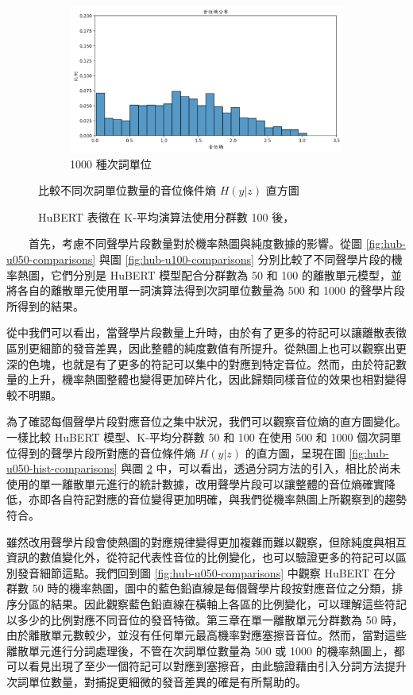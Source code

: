 {{{{\begin{figure}
\begin{subfigure}{\textwidth}
                 \centering
                 \includegraphics[width=\tempwidth]{feasiblefigs/ch4figs/hub-u100-ap1000-phnent-hist.png}
                 \caption{1000 種次詞單位}
                 \label{fig:hub-u100-ap1000-phnent-hist}
             \end{subfigure}

             \caption{HuBERT 表徵在 K-平均演算法使用分群數 100 後，}
             比較不同次詞單位數量的音位條件熵 $H(y|z)$ 直方圖
             \label{fig:hub-u100-hist-comparisons}
        \end{figure}
    }
}


　　首先，考慮不同聲學片段數量對於機率熱圖與純度數據的影響。從圖 \ref{fig:hub-u050-comparisons} 與圖 \ref{fig:hub-u100-comparisons} 分別比較了不同聲學片段的機率熱圖，它們分別是 HuBERT 模型配合分群數為 50 和 100 的離散單元模型，並將各自的離散單元使用單一詞演算法得到次詞單位數量為 500 和 1000 的聲學片段所得到的結果。\par
        從中我們可以看出，當聲學片段數量上升時，由於有了更多的符記可以讓離散表徵區別更細節的發音差異，因此整體的純度數值有所提升。從熱圖上也可以觀察出更深的色塊，也就是有了更多的符記可以集中的對應到特定音位。然而，由於符記數量的上升，機率熱圖整體也變得更加碎片化，因此歸類同樣音位的效果也相對變得較不明顯。\par
        為了確認每個聲學片段對應音位之集中狀況，我們可以觀察音位熵的直方圖變化。一樣比較 HuBERT 模型、K-平均分群數 50 和 100 在使用 500 和 1000 個次詞單位得到的聲學片段所對應的音位條件熵 $H(y|z)$ 的直方圖，呈現在圖 \ref{fig:hub-u050-hist-comparisons} 與圖 \ref{fig:hub-u100-hist-comparisons} 中，可以看出，透過分詞方法的引入，相比於尚未使用的單一離散單元進行的統計數據，改用聲學片段可以讓整體的音位熵確實降低，亦即各自符記對應的音位變得更加明確，與我們從機率熱圖上所觀察到的趨勢符合。\par
        雖然改用聲學片段會使熱圖的對應規律變得更加複雜而難以觀察，但除純度與相互資訊的數值變化外，從符記代表性音位的比例變化，也可以驗證更多的符記可以區別發音細節這點。我們回到圖 \ref{fig:hub-u050-comparisons} 中觀察 HuBERT 在分群數 50 時的機率熱圖，圖中的藍色鉛直線是每個聲學片段按對應音位之分類，排序分區的結果。因此觀察藍色鉛直線在橫軸上各區的比例變化，可以理解這些符記以多少的比例對應不同音位的發音特徵。第三章在單一離散單元分群數為 50 時，由於離散單元數較少，並沒有任何單元最高機率對應塞擦音音位。然而，當對這些離散單元進行分詞處理後，不管在次詞單位數量為 500 或 1000 的機率熱圖上，都可以看見出現了至少一個符記可以對應到塞擦音，由此驗證藉由引入分詞方法提升次詞單位數量，對捕捉更細微的發音差異的確是有所幫助的。


}}
